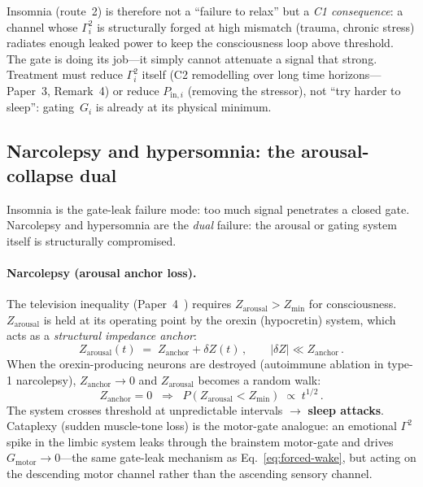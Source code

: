 \documentclass[aps,pre,twocolumn,superscriptaddress,floatfix]{revtex4-2}
\begin{document}
\noindent
Insomnia (route~2) is therefore not a ``failure to relax''
but a \emph{C1 consequence}: a channel whose
$\Gamma_i^2$ is structurally forged at high mismatch
(trauma, chronic stress) radiates enough leaked power
to keep the consciousness loop above threshold.
The gate is doing its job---it simply cannot attenuate
a signal that strong.
Treatment must reduce $\Gamma_i^2$ itself (C2
remodelling over long time horizons---Paper~3, Remark~4)
or reduce $P_{\mathrm{in},i}$ (removing the stressor),
not ``try harder to sleep'':
gating~$G_i$ is already at its physical minimum.

\subsection{Narcolepsy and hypersomnia:
  the arousal-collapse dual}
\label{sec:narcolepsy-hypersomnia}

Insomnia is the gate-leak failure mode:
too much signal penetrates a closed gate.
Narcolepsy and hypersomnia are the \emph{dual}
failure: the arousal or gating system itself
is structurally compromised.

\paragraph{Narcolepsy (arousal anchor loss).}
The television inequality
(Paper~4~\cite{Paper4})
requires $Z_{\mathrm{arousal}} > Z_{\min}$
for consciousness.
$Z_{\mathrm{arousal}}$ is held at its operating point
by the orexin (hypocretin) system,
which acts as a \emph{structural impedance anchor}:
\begin{equation}
  Z_{\mathrm{arousal}}(t)
  \;=\;
  Z_{\mathrm{anchor}}
  + \delta Z(t)\,,
  \qquad
  |\delta Z| \ll Z_{\mathrm{anchor}}\,.
  \label{eq:arousal-anchor}
\end{equation}
When the orexin-producing neurons are destroyed
(autoimmune ablation in type-1 narcolepsy),
$Z_{\mathrm{anchor}} \to 0$ and
$Z_{\mathrm{arousal}}$ becomes a random walk:
\begin{equation}
  Z_{\mathrm{anchor}} = 0
  \;\;\Longrightarrow\;\;
  P(Z_{\mathrm{arousal}} < Z_{\min})
  \;\propto\; t^{1/2}\,.
  \label{eq:narcolepsy}
\end{equation}
The system crosses threshold at unpredictable intervals
$\to$ \textbf{sleep attacks}.
Cataplexy (sudden muscle-tone loss) is the
motor-gate analogue: an emotional $\Gamma^2$ spike
in the limbic system leaks through the
brainstem motor-gate and drives
$G_{\text{motor}} \to 0$---the same gate-leak
mechanism as Eq.~\eqref{eq:forced-wake},
but acting on the descending motor channel
rather than the ascending sensory channel.
\end{document}
